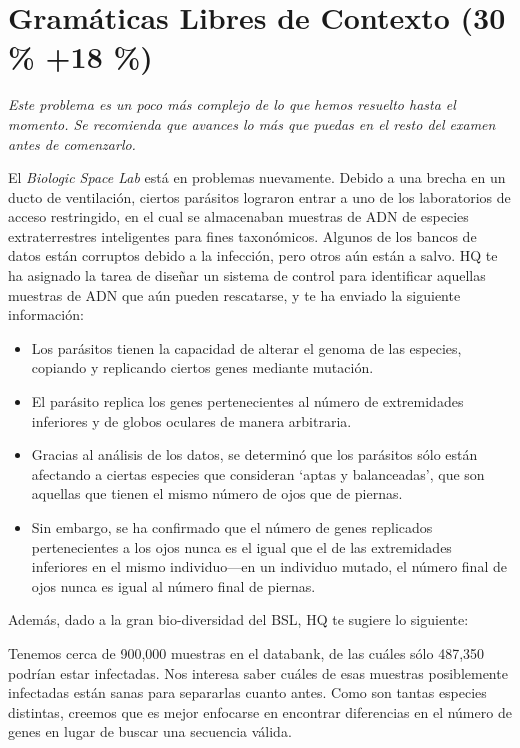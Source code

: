 \documentclass[8pt, onside]{article}
\begin{document}
\section{Gramáticas Libres de Contexto (30 \% +18 \%)}

{\small \it
Este problema es un poco más complejo de lo que hemos resuelto hasta el momento.
Se recomienda que avances lo más que puedas en el resto del examen antes de comenzarlo.
}

\bigskip

El \textit{Biologic Space Lab} está en problemas nuevamente.
Debido a una brecha en un ducto de ventilación, ciertos parásitos lograron entrar a uno de los laboratorios de acceso restringido, en el cual se almacenaban muestras de ADN de especies extraterrestres inteligentes para fines taxonómicos.
Algunos de los bancos de datos están corruptos debido a la infección, pero otros aún están a salvo.
HQ te ha asignado la tarea de diseñar un sistema de control para identificar aquellas muestras de ADN que aún pueden rescatarse, y te ha enviado la siguiente información:

\begin{itemize}
    \itemsep0em
    \item Los parásitos tienen la capacidad de alterar el genoma de las especies, copiando y replicando ciertos genes mediante mutación.
    \item El parásito replica los genes pertenecientes al número de extremidades inferiores y de globos oculares de manera arbitraria.
    \item Gracias al análisis de los datos, se determinó que los parásitos sólo están afectando a ciertas especies que consideran `aptas y balanceadas', que son aquellas que tienen el mismo número de ojos que de piernas.
    \item Sin embargo, se ha confirmado que el número de genes replicados pertenecientes a los ojos nunca es el igual que el de las extremidades inferiores en el mismo individuo---en un individuo mutado, el número final de ojos nunca es igual al número final de piernas.
\end{itemize}

Además, dado a la gran bio-diversidad del BSL, HQ te sugiere lo siguiente:

\begin{tcolorbox}
{\small Tenemos cerca de 900,000 muestras en el databank, de las cuáles sólo 487,350 podrían estar infectadas.
Nos interesa saber cuáles de esas muestras posiblemente infectadas están sanas para separarlas cuanto antes.
Como son tantas especies distintas, creemos que es mejor enfocarse en encontrar diferencias en el número de genes en lugar de buscar una secuencia válida.}
\end{tcolorbox}
\end{document}
